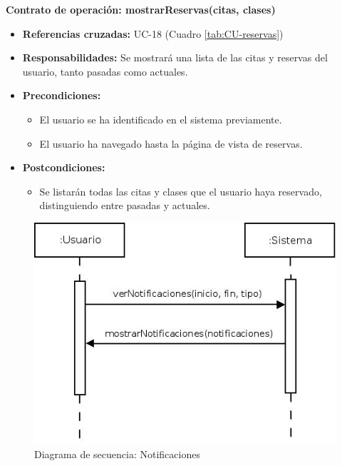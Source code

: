 \textbf{Contrato de operación: mostrarReservas(citas, clases)}
\begin{itemize}
\item \textbf{Referencias cruzadas:} UC-18 (Cuadro \ref{tab:CU-reservas})
\item \textbf{Responsabilidades:} Se mostrará una lista de las citas y reservas del usuario, tanto pasadas como actuales.
\item \textbf{Precondiciones:} 
 \begin{itemize}
\item El usuario se ha identificado en el sistema previamente.
\item El usuario ha navegado hasta la página de vista de reservas.
\end {itemize}
\item \textbf{Postcondiciones:} 
 \begin{itemize}
\item Se listarán todas las citas y clases que el usuario haya reservado, distinguiendo entre pasadas y actuales.
\end {itemize}
\end {itemize}


\vspace{7mm}
\dotfill
\vspace{7mm}

\begin{figure}[h!]
\centering
  \includegraphics[scale=.55]{img/secuencias/notificaciones.jpeg}
  \caption{Diagrama de secuencia: Notificaciones}
  \label{fig:secuencia-notificaciones}
\end{figure}

